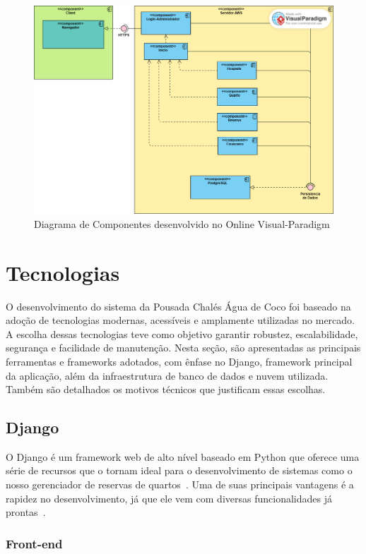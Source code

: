 \documentclass[
	12pt,				%
	openany,			%
	oneside,			%
	a4paper,			%
	english,			%
	french,				%
	spanish,			%
	brazil				%
	]{abntex2}
\begin{document}
\begin{figure}[h!]
	\centering
	\includegraphics[width=\textwidth]{0406-Componentes.png}
	\caption{Diagrama de Componentes desenvolvido no Online Visual-Paradigm}
	\label{fig:diagramacomponentes}
\end{figure}


\section{Tecnologias}
O desenvolvimento do sistema da Pousada Chalés Água de Coco foi baseado na adoção de tecnologias modernas, acessíveis e amplamente utilizadas no mercado. A escolha dessas tecnologias teve como objetivo garantir robustez, escalabilidade, segurança e facilidade de manutenção. Nesta seção, são apresentadas as principais ferramentas e frameworks adotados, com ênfase no Django, framework principal da aplicação, além da infraestrutura de banco de dados e nuvem utilizada. Também são detalhados os motivos técnicos que justificam essas escolhas.
\subsection{Django}

O Django é um framework web de alto nível baseado em Python que oferece uma série de recursos que o tornam ideal para o desenvolvimento de sistemas como o nosso gerenciador de reservas de quartos~\cite{python}. Uma de suas principais vantagens é a rapidez no desenvolvimento, já que ele vem com diversas funcionalidades já prontas~\cite{django}.

\subsubsection{Front-end}
\end{document}
